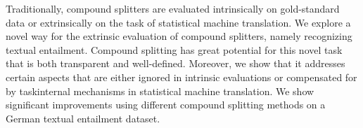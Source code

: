 Traditionally, compound splitters are evaluated intrinsically on gold-standard data or extrinsically on the task of statistical machine translation. We explore a novel way for the extrinsic evaluation of compound splitters, namely recognizing textual entailment. Compound splitting has great potential for this novel task that is both transparent and well-defined. Moreover, we show that it addresses certain aspects that are either ignored in intrinsic evaluations or compensated for by taskinternal mechanisms in statistical machine translation. We show significant improvements using different compound splitting methods on a German textual entailment dataset.
